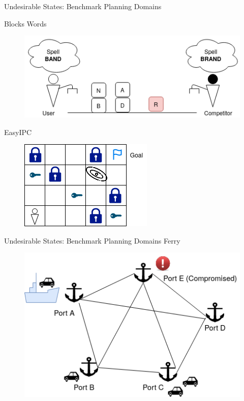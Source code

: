\begin{frame}{Undesirable States: Benchmark Planning Domains}

Blocks Words
\begin{figure}[ht]
  \centering
\includegraphics[width=0.7\columnwidth]{img/blocks.png}
\end{figure}

EasyIPC
\begin{figure}[ht]
  \centering
\includegraphics[width=0.5\columnwidth]{img/ipc.png}
\end{figure}
\end{frame}





\begin{frame}{Undesirable States: Benchmark Planning Domains}
Ferry
\begin{figure}[ht]
  \centering
\includegraphics[width=0.5\columnwidth]{img/ferry.png}
\end{figure}
\end{frame}


